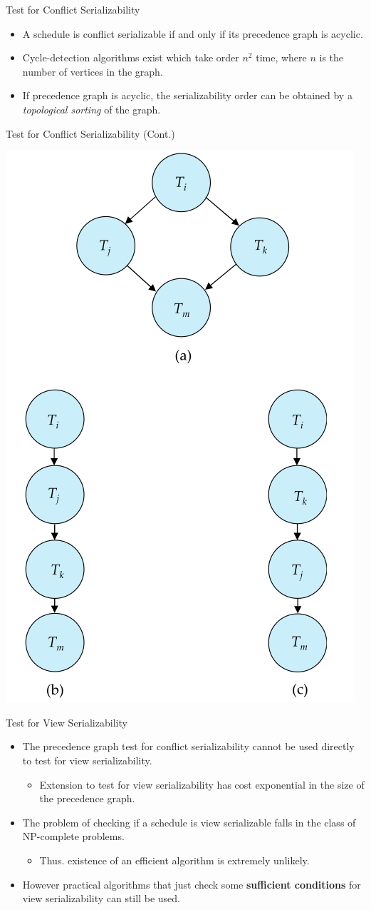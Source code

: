 \documentclass{beamer}
\begin{document}
\begin{frame}{Test for Conflict Serializability}
    \begin{itemize}
        \item A schedule is conflict serializable if and only if its precedence graph is acyclic.
        \item Cycle-detection algorithms exist which take order $n^2$ time, where $n$ is the number of vertices in the graph.
        \item If precedence graph is acyclic, the serializability order can be obtained by a \textit{topological sorting} of the graph.
    \end{itemize}
\end{frame}

\begin{frame}{Test for Conflict Serializability (Cont.)}

    \centering
    \includegraphics[width=.4\textwidth]{figures/graph2}

\end{frame}

\begin{frame}{Test for View Serializability}

    \begin{itemize}
        \item The precedence graph test for conflict serializability cannot be used directly to test for view serializability.
            \begin{itemize}
                \item Extension to test for view serializability has cost exponential in the size of the precedence graph.
            \end{itemize}
        \item The problem of checking if a schedule is view serializable falls in the class of NP-complete problems.
            \begin{itemize}
                \item Thus. existence of an efficient algorithm is extremely unlikely.
            \end{itemize}
        \item However practical algorithms that just check some \textbf{sufficient conditions} for view serializability can still be used.
    \end{itemize}

\end{frame}
\end{document}
